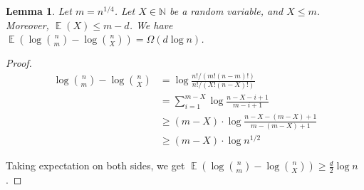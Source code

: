 \documentclass[10pt]{article}
\DeclareMathOperator*{\E}{\mathbb{E}}
\newtheorem{lemma}{Lemma}
\begin{document}
\begin{lemma}
  Let $m=n^{1/4}$. Let $X\in \mathbb{N}$ be a random variable, and $X\le m$. Moreover, $\E(X)\le m-d$. We have $\E(\log {n \choose m}-\log {n \choose X})=\Omega(d \log n)$.
\end{lemma}

\begin{proof}
  \begin{align*}
    \log {n \choose m}-\log {n \choose X}
    &=   \log \frac{n!/(m!(n-m)!)}{n!/(X!(n-X)!)} \\
    &=   \sum_{i=1}^{m-X}\log \frac{n-X-i+1}{m-i+1} \\
    &\ge (m-X)\cdot \log \frac{n-X-(m-X)+1}{m-(m-X)+1} \\
    &\ge (m-X)\cdot \log n^{1/2}
  \end{align*}
  
  Taking expectation on both sides, we get $\E(\log {n \choose m}-\log {n \choose X})\ge \frac{d}{2} \log n$. 
\end{proof}



\end{document}
